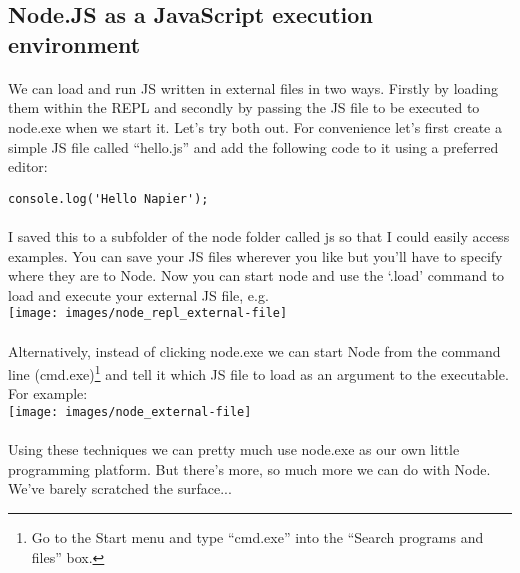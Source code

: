 \documentclass[10pt, a4paper, twosize]{article}
\begin{document}
\subsection{Node.JS as a JavaScript execution environment}
\paragraph{} We can load and run JS written in external files in two ways. Firstly by loading them within the REPL and secondly by passing the JS file to be executed to node.exe when we start it. Let's try both out. For convenience let's first create a simple JS file called ``hello.js'' and add the following code to it using a preferred editor:

\begin{lstlisting}
console.log('Hello Napier');
\end{lstlisting}

\paragraph{} I saved this to a subfolder of the node folder called js so that I could easily access examples. You can save your JS files wherever you like but you'll have to specify where they are to Node. Now you can start node and use the `.load' command to load and execute your external JS file, e.g.\\

\texttt{[image: images/node\_repl\_external-file]}

\paragraph{} Alternatively, instead of clicking node.exe we can start Node from the command line (cmd.exe)\footnote{Go to the Start menu and type ``cmd.exe'' into the ``Search programs and files'' box.} and tell it which JS file to load as an argument to the executable. For example:\\

\texttt{[image: images/node\_external-file]}

\paragraph{} Using these techniques we can pretty much use node.exe as our own little programming platform. But there's more, so much more we can do with Node. We've barely scratched the surface...
\end{document}
